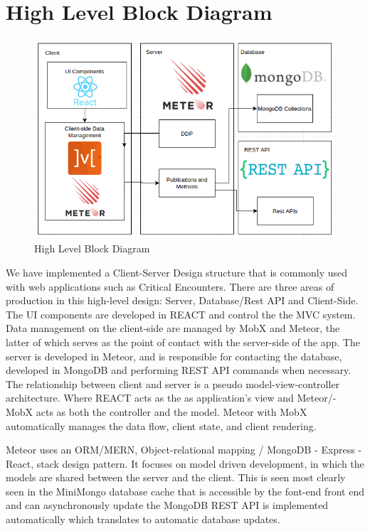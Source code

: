 \documentclass[letterpaper, 10 pt, conference]{ieeeconf}
\begin{document}
\section{High Level Block Diagram}
	\begin{figure}[H]
	\centering
	\centerline{\includegraphics[scale=.3]{high_level_block_diagram}}
	\caption{High Level Block Diagram}
	\label{fig: High Level Block Diagram }
	\end{figure}

We have implemented a Client-Server Design structure that is commonly used
with web applications such as Critical Encounters. There are three areas of production
in this high-level design: Server, Database/Rest API and Client-Side. The UI
components are developed in REACT and control the the MVC system.
Data management on the client-side are managed by MobX and Meteor, the
latter of which serves as the point of contact with the server-side of the app.
The server is developed in Meteor, and is responsible for contacting
the database, developed in MongoDB and performing REST API commands when
necessary.
The relationship between client and server is a pseudo model-view-controller
architecture. Where REACT acts as the as application’s view and Meteor/-
MobX acts as both the controller and the model. Meteor with MobX automatically manages the data flow, client state, and client rendering. \par
Meteor uses an ORM/MERN, Object-relational mapping / MongoDB
- Express - React, stack design pattern. It focuses on model driven development,
in which the models are shared between the server and the client. This
is seen most clearly seen in the MiniMongo database cache that is accessible by
the font-end front end and can asynchronously update the MongoDB REST API
is implemented automatically which translates to automatic database updates.
\end{document}

